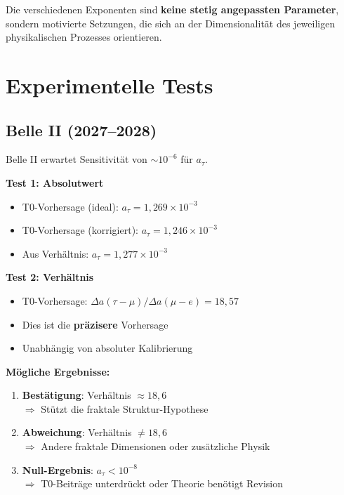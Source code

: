 	Die verschiedenen Exponenten sind \textbf{keine stetig angepassten Parameter}, sondern motivierte Setzungen, die sich an der Dimensionalität des jeweiligen physikalischen Prozesses orientieren.
	
	\section{Experimentelle Tests}
	
	\subsection{Belle II (2027--2028)}
	
	Belle II erwartet Sensitivität von $\sim 10^{-6}$ für $a_\tau$.
	
	\textbf{Test 1: Absolutwert}
	\begin{itemize}
		\item T0-Vorhersage (ideal): $a_\tau = 1{,}269 \times 10^{-3}$
		\item T0-Vorhersage (korrigiert): $a_\tau = 1{,}246 \times 10^{-3}$
		\item Aus Verhältnis: $a_\tau = 1{,}277 \times 10^{-3}$
	\end{itemize}
	
	\textbf{Test 2: Verhältnis}
	\begin{itemize}
		\item T0-Vorhersage: $\Delta a(\tau - \mu) / \Delta a(\mu - e) = 18{,}57$
		\item Dies ist die \textbf{präzisere} Vorhersage
		\item Unabhängig von absoluter Kalibrierung
	\end{itemize}
	
	\textbf{Mögliche Ergebnisse:}
	\begin{enumerate}
		\item \textbf{Bestätigung}: Verhältnis $\approx 18{,}6$ \\
		$\Rightarrow$ Stützt die fraktale Struktur-Hypothese
		
		\item \textbf{Abweichung}: Verhältnis $\neq 18{,}6$ \\
		$\Rightarrow$ Andere fraktale Dimensionen oder zusätzliche Physik
		
		\item \textbf{Null-Ergebnis}: $a_\tau < 10^{-8}$ \\
		$\Rightarrow$ T0-Beiträge unterdrückt oder Theorie benötigt Revision
	\end{enumerate}
	
